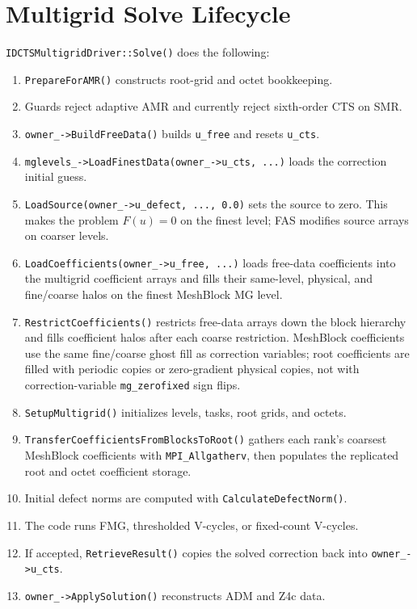 \documentclass[11pt]{article}
\newcommand{\code}[1]{\texttt{#1}}
\begin{document}
\section{Multigrid Solve Lifecycle}

\code{IDCTSMultigridDriver::Solve()} does the following:
\begin{enumerate}
  \item \code{PrepareForAMR()} constructs root-grid and octet bookkeeping.
  \item Guards reject adaptive AMR and currently reject sixth-order CTS on SMR.
  \item \code{owner\_->BuildFreeData()} builds \code{u\_free} and resets
        \code{u\_cts}.
  \item \code{mglevels\_->LoadFinestData(owner\_->u\_cts, ...)} loads the
        correction initial guess.
  \item \code{LoadSource(owner\_->u\_defect, ..., 0.0)} sets the source to zero.
        This makes the problem \(F(u)=0\) on the finest level; FAS modifies source
        arrays on coarser levels.
  \item \code{LoadCoefficients(owner\_->u\_free, ...)} loads free-data
        coefficients into the multigrid coefficient arrays and fills their
        same-level, physical, and fine/coarse halos on the finest MeshBlock MG
        level.
  \item \code{RestrictCoefficients()} restricts free-data arrays down the block
        hierarchy and fills coefficient halos after each coarse restriction.
        MeshBlock coefficients use the same fine/coarse ghost fill as
        correction variables; root coefficients are filled with periodic copies
        or zero-gradient physical copies, not with correction-variable
        \code{mg\_zerofixed} sign flips.
  \item \code{SetupMultigrid()} initializes levels, tasks, root grids, and octets.
  \item \code{TransferCoefficientsFromBlocksToRoot()} gathers each rank's
        coarsest MeshBlock coefficients with \code{MPI\_Allgatherv}, then
        populates the replicated root and octet coefficient storage.
  \item Initial defect norms are computed with \code{CalculateDefectNorm()}.
  \item The code runs FMG, thresholded V-cycles, or fixed-count V-cycles.
  \item If accepted, \code{RetrieveResult()} copies the solved correction back
        into \code{owner\_->u\_cts}.
  \item \code{owner\_->ApplySolution()} reconstructs ADM and Z4c data.
\end{enumerate}
\end{document}
